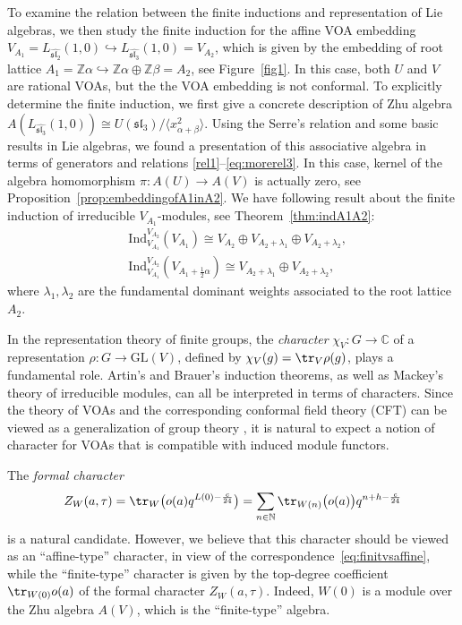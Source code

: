 \documentclass[12pt,a4paper,reqno]{amsart}
\numberwithin{equation}{section}
\numberwithin{equation}{section}
\theoremstyle{definition}
\newcommand{\N}{\mathbb{N}}
\newcommand{\Z}{\mathbb{Z}}
\def \ra {\rightarrow}
\def \C {\mathbb{C}}
\def\la{\lambda}
\def \al{\alpha}
\def\hr{\hookrightarrow}
\def \b {\beta}
\def \op {\oplus}
\def\Ind{\mathrm{Ind}}
\def\<{\langle}
\def\>{\rangle}
\def\Ind{\mathrm{Ind}}
\def\sl{\mathfrak{sl}}
\begin{document}
To examine the relation between the finite inductions and representation of Lie algebras, we then study the finite induction for the affine VOA embedding $V_{A_1}=L_{\widehat{\sl_2}}(1,0)\hr  L_{\widehat{\sl_3}}(1,0)=V_{A_2}$, which is given by the embedding of root lattice $A_1=\Z\al\hr \Z\al\op \Z\b=A_2$, see Figure~\ref{fig1}. In this case, both $U$ and $V$ are rational VOAs, but the the VOA embedding is not conformal. To explicitly determine the finite induction, we first give a concrete description of Zhu algebra $A(L_{\widehat{\sl_3}}(1,0))\cong U(\sl_3)/\<x_{\al+\b}^2\>$. Using the Serre's relation and some basic results in Lie algebras, we found a presentation of this associative algebra in terms of generators and relations \eqref{rel1}--\eqref{eq:morerel3}. In this case, kernel of the algebra homomorphism $\pi:A(U)\ra A(V)$ is actually zero, see Proposition~\ref{prop:embeddingofA1inA2}. We have following result about the finite induction of irreducible $V_{A_1}$-modules, see Theorem~\ref{thm:indA1A2}: 
\begin{equation}\label{eq:introA1A2ind1}
\begin{aligned}
&	\Ind^{V_{A_2}}_{V_{A_1}}(V_{A_1})\cong V_{A_2}\op V_{A_2+\la_1}\op V_{A_2+\la_2},\\ 
&	\Ind^{V_{A_2}}_{V_{A_1}}(V_{A_1+\frac{1}{2}\al})\cong V_{A_2+\la_1}\op V_{A_2+\la_2},
\end{aligned}
\end{equation}
where $\la_1,\la_2$ are the fundamental dominant weights associated to the root lattice $A_2$. 


In the representation theory of finite groups, the \emph{character} $\chi_V:G\ra \C$ of a representation $\rho:G\ra \mathrm{GL}(V)$, defined by $\chi_V(g)=\tr_{V}\rho(g)$, plays a fundamental role. Artin's and Brauer's induction theorems, as well as Mackey's theory of irreducible modules, can all be interpreted in terms of characters. Since the theory of VOAs and the corresponding conformal field theory (CFT) can be viewed as a generalization of group theory \cite{MS89}, it is natural to expect a notion of character for VOAs that is compatible with induced module functors. 

The \emph{formal character} \cite{FLM,Z} 
\[
Z_W(a,\tau)=\tr_{W}\big(o(a) q^{L(0)-\frac{c}{24}}\big)
=\sum_{n\in \N} \tr_{W(n)}\big(o(a)\big) q^{n+h-\frac{c}{24}}
\]
is a natural candidate. However, we believe that this character should be viewed as an ``affine-type'' character, in view of the correspondence~\eqref{eq:finitvsaffine}, while the ``finite-type'' character is given by the top-degree coefficient $\tr_{W(0)} o(a)$ of the formal character $Z_W(a,\tau)$. Indeed, $W(0)$ is a module over the Zhu algebra $A(V)$, which is the ``finite-type'' algebra. 
\end{document}
